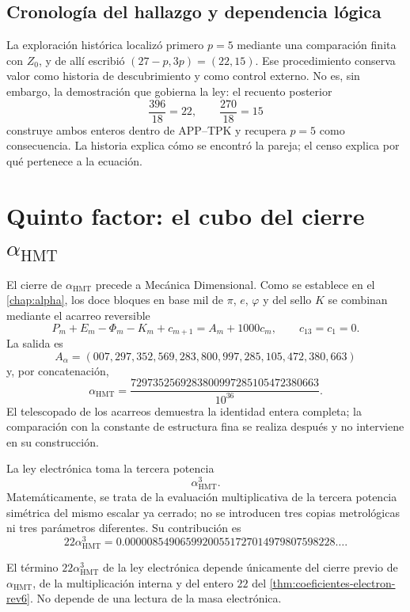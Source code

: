 \subsection{Cronología del hallazgo y dependencia lógica}

La exploración histórica localizó primero \(p=5\) mediante una comparación
finita con \(Z_0\), y de allí escribió
\((27-p,3p)=(22,15)\). Ese procedimiento conserva valor como historia de
descubrimiento y como control externo. No es, sin embargo, la demostración
que gobierna la ley: el recuento posterior
\[
 \frac{396}{18}=22,
 \qquad
 \frac{270}{18}=15
\]
construye ambos enteros dentro de APP--TPK y recupera \(p=5\) como
consecuencia. La historia explica cómo se encontró la pareja; el censo
explica por qué pertenece a la ecuación.

\section{Quinto factor: el cubo del cierre
\texorpdfstring{\(\alpha_{\mathrm{HMT}}\)}{alpha HMT}}

El cierre de \(\alpha_{\mathrm{HMT}}\) precede a Mecánica Dimensional.
Como se establece en el \cref{chap:alpha}, los doce bloques en base mil
de \(\pi\), \(e\), \(\varphi\) y del sello \(K\) se combinan mediante el
acarreo reversible
\[
 P_m+E_m-\Phi_m-K_m+c_{m+1}
 =A_m+1000c_m,
 \qquad c_{13}=c_1=0.
\]
La salida es
\[
 A_\alpha=
 (007,297,352,569,283,800,997,285,105,472,380,663)
\]
y, por concatenación,
\[
 \alpha_{\mathrm{HMT}}
 =
 \frac{
 7297352569283800997285105472380663
 }{10^{36}}.
\]
El telescopado de los acarreos demuestra la identidad entera completa; la
comparación con la constante de estructura fina se realiza después y no
interviene en su construcción.

La ley electrónica toma la tercera potencia
\[
 \alpha_{\mathrm{HMT}}^3.
\]
Matemáticamente, se trata de la evaluación multiplicativa de la tercera
potencia simétrica del mismo escalar ya cerrado; no se introducen tres
copias metrológicas ni tres parámetros diferentes. Su contribución es
\[
 22\alpha_{\mathrm{HMT}}^3
 =
 0.00000854906599200551727014979807598228\ldots.
\]

\begin{proposition}
\label{prop:alpha-cubica-electron-rev6}
El término \(22\alpha_{\mathrm{HMT}}^3\) de la ley electrónica depende
únicamente del cierre previo de \(\alpha_{\mathrm{HMT}}\), de la
multiplicación interna y del entero \(22\) del
\cref{thm:coeficientes-electron-rev6}. No depende de una lectura de la
masa electrónica.
\end{proposition}

